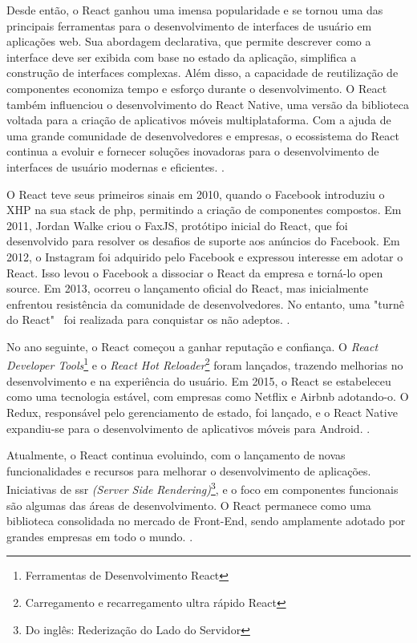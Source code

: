Desde então, o React ganhou uma imensa popularidade e se tornou uma das
principais ferramentas para o desenvolvimento de interfaces de usuário em aplicações web.
Sua abordagem declarativa, que permite descrever como a interface deve ser exibida com
base no estado da aplicação, simplifica a construção de interfaces complexas. Além disso, a
capacidade de reutilização de componentes economiza tempo e esforço durante o
desenvolvimento. O React também influenciou o desenvolvimento do React Native, uma
versão da biblioteca voltada para a criação de aplicativos móveis multiplataforma. Com a
ajuda de uma grande comunidade de desenvolvedores e empresas, o ecossistema do React
continua a evoluir e fornecer soluções inovadoras para o desenvolvimento de interfaces de
usuário modernas e eficientes.
\cite{morais-react}.

O React teve seus primeiros sinais em 2010, quando o Facebook introduziu o XHP
na sua stack de
\acrshort{php},
permitindo a criação de componentes compostos. Em 2011, Jordan
Walke criou o FaxJS, protótipo inicial do React, que foi desenvolvido para resolver os
desafios de suporte aos anúncios do Facebook. Em 2012, o Instagram foi adquirido pelo
Facebook e expressou interesse em adotar o React. Isso levou o Facebook a dissociar o React
da empresa e torná-lo open source. Em 2013, ocorreu o lançamento oficial do React, mas
inicialmente enfrentou resistência da comunidade de desenvolvedores. No entanto, uma "turnê
do React"~ foi realizada para conquistar os não adeptos.
\cite{morais-react}.

No ano seguinte, o React começou a ganhar reputação e confiança. O
\textit{React Developer Tools}\footnote{Ferramentas de Desenvolvimento React
}
e o
\textit{React Hot Reloader}\footnote{Carregamento e recarregamento ultra rápido React
}
foram lançados, trazendo melhorias no
desenvolvimento e na experiência do usuário. Em 2015, o React se estabeleceu como uma
tecnologia estável, com empresas como Netflix e Airbnb adotando-o. O Redux, responsável
pelo gerenciamento de estado, foi lançado, e o React Native expandiu-se para o
desenvolvimento de aplicativos móveis para Android.
\cite{morais-react}.

Atualmente, o React continua evoluindo, com o lançamento de novas
funcionalidades e recursos para melhorar o desenvolvimento de aplicações. Iniciativas de
\acrshort{ssr}
\textit{(Server Side Rendering)}\footnote{Do inglês: Rederização do Lado do Servidor
}, e o foco em componentes funcionais são algumas das áreas de
desenvolvimento. O React permanece como uma biblioteca consolidada no mercado de
Front-End, sendo amplamente adotado por grandes empresas em todo o mundo.
\cite{morais-react}.

